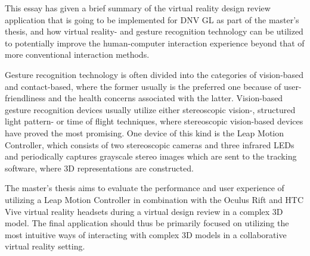 
This essay has given a brief summary of the virtual reality design review application that is going to be implemented for DNV GL as part of the master's thesis, and how virtual reality- and gesture recognition technology can be utilized to potentially improve the human-computer interaction experience beyond that of more conventional interaction methods. 

Gesture recognition technology is often divided into the categories of vision-based and contact-based, where the former usually is the preferred one because of user-friendliness and the health concerns associated with the latter. Vision-based gesture recognition devices usually utilize either stereoscopic vision-, structured light pattern- or time of flight techniques, where stereoscopic vision-based devices have proved the most promising. One device of this kind is the Leap Motion Controller, which consists of two stereoscopic cameras and three infrared LEDs and periodically captures grayscale stereo images which are sent to the tracking software, where 3D representations are constructed. 

The master's thesis aims to evaluate the performance and user experience of utilizing a Leap Motion Controller in combination with the Oculus Rift and HTC Vive virtual reality headsets during a virtual design review in a complex 3D model. The final application should thus be primarily focused on utilizing the most intuitive ways of interacting with complex 3D models in a collaborative virtual reality setting.     	                                     



